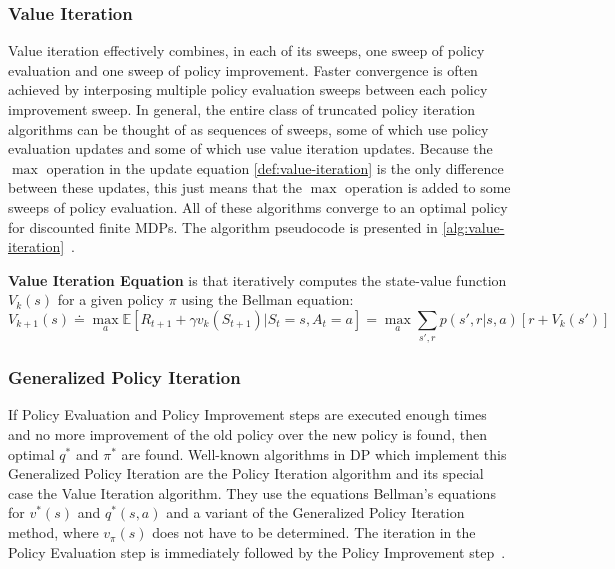 \documentclass[../xlapes02]{subfiles}
\begin{document}
    \subsubsection{Value Iteration}\label{subsubsec:value-iteration}
    Value iteration effectively combines, in each of its sweeps, one sweep of policy evaluation and one sweep of policy improvement. Faster convergence is often achieved by interposing multiple policy evaluation sweeps between each policy improvement sweep. In general, the entire class of truncated policy iteration algorithms can be thought of as sequences of sweeps, some of which use policy evaluation updates and some of which use value iteration updates. Because the $\max$ operation in the update equation \cref{def:value-iteration} is the only difference between these updates, this just means that the $\max$ operation is added to some sweeps of policy evaluation. All of these algorithms converge to an optimal policy for discounted finite MDPs. The algorithm pseudocode is presented in \cref{alg:value-iteration}~\cite{sutton2018reinforcement}.

    \begin{definition}
        \label{def:value-iteration}
        \textbf{Value Iteration Equation} is that iteratively computes the state-value function $V_k(s)$ for a given policy $\pi$ using the Bellman equation:
        \[
            V_{k+1}(s) \doteq \max_a \mathbb{E}\left[ R_{t+1} + \gamma v_k(S_{t+1}) | S_t = s, A_t = a \right]
            = \max_a \sum_{s', r} p(s', r|s, a) [r + V_k(s')]
        \]
    \end{definition}

    \subsubsection{Generalized Policy Iteration}\label{subsubsec:generalized-policy-iteration}
    If Policy Evaluation and Policy Improvement steps are executed enough times and no more improvement of the old policy over the new policy is found, then optimal $q^*$ and $\pi^*$ are found. Well-known algorithms in DP which implement this Generalized Policy Iteration are the Policy Iteration algorithm and its special case the Value Iteration algorithm. They use the equations Bellman's equations for $v^*(s)$ and $q^*(s,a)$ and a variant of the Generalized Policy Iteration method, where $v_{\pi}(s)$ does not have to be determined. The iteration in the Policy Evaluation step is immediately followed by the Policy Improvement step~\cite{sutton2018reinforcement, 7110602}.
\end{document}
